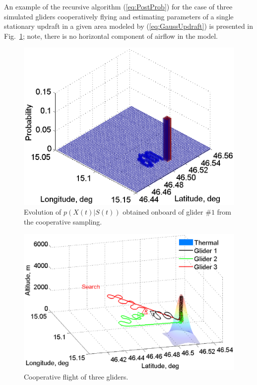 \documentclass{ifacconf}
\begin{document}
An example of the recursive algorithm (\ref{eq:PostProb}) for the case of
three simulated gliders cooperatively flying and estimating parameters of a
single stationary updraft in a given area modeled by (\ref{eq:GaussUpdraft})
is presented in Fig.~\ref{fig:SimPDF}; note, there is no horizontal component
of airflow in the model.
\begin{figure}[thpb]
  \centering
  \includegraphics[scale=0.51]{Figures/Mapping_thermals_2.eps}
  \caption{Evolution of $p(X(t)\vert S(t))$ obtained onboard of glider $\#1$ from
  the cooperative sampling.}
  \label{fig:SimPDF}
\end{figure}
\begin{figure}[thp]
  \centering
  \includegraphics[scale=0.41]{Figures/paths_cooperative_flight_2.eps}
  \caption{Cooperative flight of three gliders.}
  \label{fig:CoopFlightPaths}
\end{figure}
\end{document}
